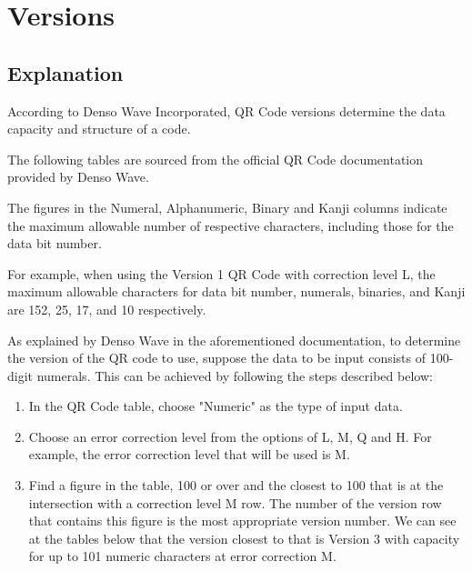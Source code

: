 \documentclass[../../2_specs]{subfiles}
\begin{document}
\section{Versions}

\subsection{Explanation}

According to Denso Wave Incorporated, QR Code versions determine the data capacity and structure of a code\cite{denso-wave-qr-versions}.

The following tables are sourced from the official QR Code documentation provided by Denso Wave.

The figures in the Numeral, Alphanumeric, Binary and Kanji columns indicate the maximum allowable number of respective characters, including those for the data bit number.

For example, when using the Version 1 QR Code with correction level L, the maximum allowable characters for data bit number, numerals, binaries, and Kanji are 152, 25, 17, and 10 respectively.

As explained by Denso Wave in the aforementioned documentation, to determine the version of the QR code to use, suppose the data to be input consists of 100-digit numerals. This can be achieved by following the steps described below\cite{denso-wave-qr-versions}:

\begin{enumerate}
  \item In the QR Code table, choose "Numeric" as the type of input data.
  \item Choose an error correction level from the options of L, M, Q and H. For example, the error correction level that will be used is M.
  \item Find a figure in the table, 100 or over and the closest to 100 that is at the intersection with a correction level M row. The number of the version row that contains this figure is the most appropriate version number. We can see at the tables below that the version closest to that is Version 3 with capacity for up to 101 numeric characters at error correction M. 
\end{enumerate}
\end{document}
